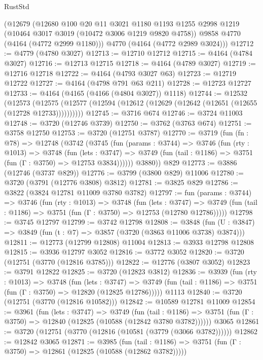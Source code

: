 \begin{lexlean}{RustStd}
\begin{coremodule}
    (@12679
      (@12680
        @100
        @20
        @11
        @3021
        @1180
        @1193
        @1255
        @2998
        @1219
        (@10464 @3017 @3019 (@10472 @3006 @1219 @9820 @4758))
        @9858
        @4770
        (@4164 (@4772 @2999 @1180)))
      @4770
      (@4164 (@4772 @2989 @3024)))
@12712 := @4779 (@4780 @3027)
@12713 := @12710 @12712
@12715 := @4164 (@4784 @3027)
@12716 := @12713 @12715
@12718 := @4164 (@4789 @3027)
@12719 := @12716 @12718
@12722 := @4164 (@4793 @3027 @63)
@12723 := @12719 @12722
@12727 := @4164 (@4798 @791 @63 @211)
@12728 := @12723 @12727
@12733 := @4164 (@4165 (@4166 (@4804 @3027)) @1118)
@12744 := @12532
    (@12573 (@12575 (@12577 (@12594 (@12612 (@12629 (@12642 (@12651 (@12655 (@12728 @12733))))))))))
@12745 := @3716 @674
@12746 := @3724 @11003
@12748 := @3720 (@12746 @3739)
@12750 := @3762 (@3763 @674)
@12751 := @3758 @12750
@12753 := @3720 (@12751 @3787)
@12770 := @3719
    (fun (fn : @78) =>
    @12748
      (@3742
        (@3745
          (fun (params : @3744) =>
          @3746
            (fun (rty : @1013) =>
            @3748
              (fun (lets : @3747) =>
              @3749 (fun (tail : @1186) => @3751 (fun (Γ : @3750) => @12753 @3834))))))
        @3880))
    @829
@12773 := @3886 (@12746 (@3737 @829))
@12776 := @3799 (@3800 @829) @11006
@12780 := @3720 (@3791 (@12776 @3808) @3812)
@12781 := @3825 @829
@12786 := @3822 (@3824 @12781 @11009 @3780 @3782)
@12797 := fun (params : @3744) =>
  @3746
    (fun (rty : @1013) =>
    @3748
      (fun (lets : @3747) =>
      @3749 (fun (tail : @1186) => @3751 (fun (Γ : @3750) => @12753 (@12780 @12786)))))
@12798 := @3745 @12797
@12799 := @3742 @12798
@12808 := @3848
    (fun (U : @3847) => @3849 (fun (t : @7) => @3857 (@3720 (@3863 @11006 @3738) @3874)))
@12811 := @12773 (@12799 @12808) @11004
@12813 := @3933 @12798 @12808
@12815 := @3936 @12797 @3052
@12816 := @3772 @3052
@12820 := @3720 (@12751 (@3770 (@12816 @3785)))
@12822 := @12776 (@3807 @3052)
@12823 := @3791 @12822
@12825 := @3720 (@12823 @3812)
@12836 := @3939
    (fun (rty : @1013) =>
    @3748
      (fun (lets : @3747) =>
      @3749 (fun (tail : @1186) => @3751 (fun (Γ : @3750) => @12820 (@12825 @12786)))))
    @1113
@12840 := @3720 (@12751 (@3770 (@12816 @10582)))
@12842 := @10589 @12781 @11009
@12854 := @3961
    (fun (lets : @3747) =>
    @3749
      (fun (tail : @1186) =>
      @3751 (fun (Γ : @3750) => @12840 (@12825 (@10588 (@12842 @3780 @3782))))))
    @3065
@12861 := @3720 (@12751 (@3770 (@12816 (@10581 (@3779 (@3066 @3782))))))
@12862 := @12842 @3065
@12871 := @3985
    (fun (tail : @1186) => @3751 (fun (Γ : @3750) => @12861 (@12825 (@10588 (@12862 @3782)))))

\end{coremodule}
\end{lexlean}

